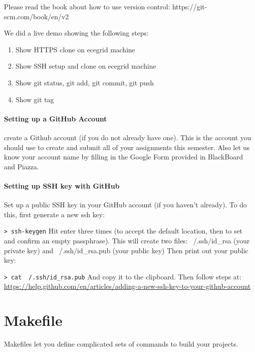 \documentclass{article}
\begin{document}
Please read the book about how to use version control: https://git-scm.com/book/en/v2

We did a live demo showing the following steps:
\begin{enumerate}
\item Show HTTPS clone on ecegrid machine
\item Show SSH setup and clone on ecegrid machine
\item Show git status, git add, git commit, git push
\item Show git tag
\end{enumerate}

\paragraph{Setting up a GitHub Account} create a Github account (if you do not already have one). This is the account you should use to create and submit all of your assignments this semester.
Also let us know your account name by filling in the Google Form provided in BlackBoard and Piazza.

\paragraph{Setting up SSH key with GitHub}
Set up a public SSH key in your GitHub account (if you haven't already). To do this, first generate a new ssh key:

\texttt{> ssh-keygen} \linebreak
Hit enter three times (to accept the default location, then to set and confirm an empty passphrase). This will create two files: ~/.ssh/id\_rsa (your private key) and ~/.ssh/id\_rsa.pub (your public key)
Then print out your public key:

\texttt{> cat ~/.ssh/id\_rsa.pub} \linebreak
And copy it to the clipboard. 
Then follow steps at: \href{https://help.github.com/en/articles/adding-a-new-ssh-key-to-your-github-account}{https://help.github.com/en/articles/adding-a-new-ssh-key-to-your-github-account} 

\section{Makefile}
Makefiles let you define complicated sets of commands to build your projects.
\end{document}
